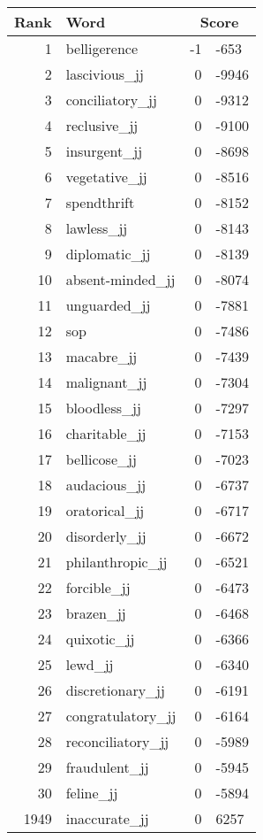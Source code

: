 \begin{longtable}[!htbp]{| rlr@{.}l |}
    \hline
    \textbf{Rank} & \textbf{Word} & \multicolumn{2}{c|}{\textbf{Score}} \\
    \hline
    \endhead
    1 & belligerence & -1 & -653 \\
    2 & lascivious\_jj & 0 & -9946 \\
    3 & conciliatory\_jj & 0 & -9312 \\
    4 & reclusive\_jj & 0 & -9100 \\
    5 & insurgent\_jj & 0 & -8698 \\
    6 & vegetative\_jj & 0 & -8516 \\
    7 & spendthrift & 0 & -8152 \\
    8 & lawless\_jj & 0 & -8143 \\
    9 & diplomatic\_jj & 0 & -8139 \\
    10 & absent-minded\_jj & 0 & -8074 \\
    11 & unguarded\_jj & 0 & -7881 \\
    12 & sop & 0 & -7486 \\
    13 & macabre\_jj & 0 & -7439 \\
    14 & malignant\_jj & 0 & -7304 \\
    15 & bloodless\_jj & 0 & -7297 \\
    16 & charitable\_jj & 0 & -7153 \\
    17 & bellicose\_jj & 0 & -7023 \\
    18 & audacious\_jj & 0 & -6737 \\
    19 & oratorical\_jj & 0 & -6717 \\
    20 & disorderly\_jj & 0 & -6672 \\
    21 & philanthropic\_jj & 0 & -6521 \\
    22 & forcible\_jj & 0 & -6473 \\
    23 & brazen\_jj & 0 & -6468 \\
    24 & quixotic\_jj & 0 & -6366 \\
    25 & lewd\_jj & 0 & -6340 \\
    26 & discretionary\_jj & 0 & -6191 \\
    27 & congratulatory\_jj & 0 & -6164 \\
    28 & reconciliatory\_jj & 0 & -5989 \\
    29 & fraudulent\_jj & 0 & -5945 \\
    30 & feline\_jj & 0 & -5894 \\
    1949 & inaccurate\_jj & 0 & 6257 \\

\end{longtable}
